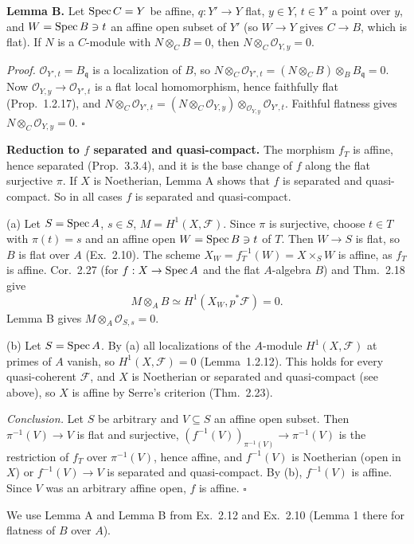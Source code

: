 \documentclass[11pt]{article}
\begin{document}
\textbf{Lemma B.} Let $\operatorname{Spec} C=Y$ be affine, $q:Y'\to Y$ flat, $y\in Y$, $t\in Y'$ a point over $y$, and $W=\operatorname{Spec} B\ni t$ an affine open subset of $Y'$ (so $W\to Y$ gives $C\to B$, which is flat). If $N$ is a $C$-module with $N\otimes_CB=0$, then $N\otimes_C\mathcal O_{Y,y}=0$.

\emph{Proof.} $\mathcal O_{Y',t}=B_{\mathfrak q}$ is a localization of $B$, so $N\otimes_C\mathcal O_{Y',t}=(N\otimes_CB)\otimes_BB_{\mathfrak q}=0$. Now $\mathcal O_{Y,y}\to\mathcal O_{Y',t}$ is a flat local homomorphism, hence faithfully flat (Prop.~1.2.17), and $N\otimes_C\mathcal O_{Y',t}=(N\otimes_C\mathcal O_{Y,y})\otimes_{\mathcal O_{Y,y}}\mathcal O_{Y',t}$. Faithful flatness gives $N\otimes_C\mathcal O_{Y,y}=0$. \hfill$\square$

\textbf{Reduction to $f$ separated and quasi-compact.} The morphism $f_T$ is affine, hence separated (Prop.~3.3.4), and it is the base change of $f$ along the flat surjective $\pi$. If $X$ is Noetherian, Lemma A shows that $f$ is separated and quasi-compact. So in all cases $f$ is separated and quasi-compact.

(a) Let $S=\operatorname{Spec} A$, $s\in S$, $M=H^1(X,\mathcal F)$. Since $\pi$ is surjective, choose $t\in T$ with $\pi(t)=s$ and an affine open $W=\operatorname{Spec} B\ni t$ of $T$. Then $W\to S$ is flat, so $B$ is flat over $A$ (Ex.~2.10). The scheme $X_W=f_T^{-1}(W)=X\times_SW$ is affine, as $f_T$ is affine. Cor.~2.27 (for $f:X\to\operatorname{Spec} A$ and the flat $A$-algebra $B$) and Thm.~2.18 give
\[ M\otimes_AB\simeq H^1(X_W,p^*\mathcal F)=0. \]
Lemma B gives $M\otimes_A\mathcal O_{S,s}=0$.

(b) Let $S=\operatorname{Spec} A$. By (a) all localizations of the $A$-module $H^1(X,\mathcal F)$ at primes of $A$ vanish, so $H^1(X,\mathcal F)=0$ (Lemma~1.2.12). This holds for every quasi-coherent $\mathcal F$, and $X$ is Noetherian or separated and quasi-compact (see above), so $X$ is affine by Serre's criterion (Thm.~2.23).

\emph{Conclusion.} Let $S$ be arbitrary and $V\subseteq S$ an affine open subset. Then $\pi^{-1}(V)\to V$ is flat and surjective, $(f^{-1}(V))_{\pi^{-1}(V)}\to\pi^{-1}(V)$ is the restriction of $f_T$ over $\pi^{-1}(V)$, hence affine, and $f^{-1}(V)$ is Noetherian (open in $X$) or $f^{-1}(V)\to V$ is separated and quasi-compact. By (b), $f^{-1}(V)$ is affine. Since $V$ was an arbitrary affine open, $f$ is affine. \hfill$\square$

\pf
We use Lemma A and Lemma B from Ex.~2.12 and Ex.~2.10 (Lemma 1 there for flatness of $B$ over $A$).
\end{document}
